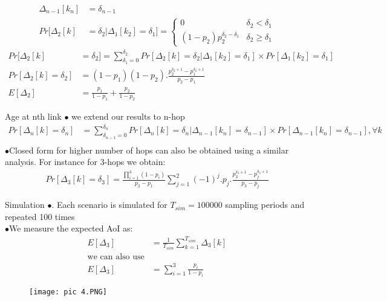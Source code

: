 \documentclass{beamer}
\begin{document}
\begin{frame}{}
 \begin{align*}
\Delta_{n-1}[k_n] &= \delta_{n-1}\\
 Pr[\Delta_2[k] &= \delta_2 | \Delta_1[k_2] = \delta_1]=
 \begin{cases}
  0&\delta_2 < \delta_1\\
  (1-p_2)p_2^{\delta_2-\delta_1} &\delta_2 \geq\delta_1
 \end{cases}
 \end{align*}
\begin{align*}
Pr[\Delta_2[k] &= \delta_2] =\sum_{\delta_1=0}^{\delta_2}
Pr[\Delta_2[k] = \delta_2 | \Delta_1[k_2] = \delta_1]
\times Pr[\Delta_1[k_2] = \delta_1]\\
Pr[\Delta_2[k] = \delta_2] &=(1-p_1)(1-p_2).\frac{p_2^{\delta_2+1}-p_1^{\delta_2+1}}{p_2-p_1}\\
E[\Delta_2]&=\frac{p_1}{1-p_1}+\frac{p_2}{1-p_2}
\end{align*}
\end{frame}

\begin{frame}{Age at nth link}
$\bullet$ we extend our results to n-hop\\
\begin{multline*}
    Pr[\Delta_n[k] = \delta_n]& =\sum_{\delta_{n-1}=0}^{\delta_n}
Pr[\Delta_n[k] = \delta_n | \Delta_{n-1}[k_n] = \delta_{n-1}]
\times Pr[\Delta_{n-1}[k_n] = \delta_{n-1}], \forall k\\
\end{multline*}
$\bullet$Closed form for higher number of hops can also be obtained
using a similar analysis. For instance for 3-hops we obtain:\\
\begin{align*}
    Pr[\Delta_3[k]=\delta_3]=\frac{\prod_{i=1}^3(1-p_i)}{p_2-p_1}\sum_{j=1}^2(-1)^j.p_j.\frac{p_3^{\delta_3+1}-p_j^{\delta_3+1}}{p_3-p_j}
\end{align*}
\end{frame}

\begin{frame}{Simulation}
   $\bullet$. Each scenario is simulated for $T_{sim} = 100 000$ sampling periods and
repeated 100 times\\
$\bullet$We measure the expected AoI as:\\
\begin{align*}
    E[\Delta_3]&=\frac{1}{T_{sim}}\sum_{k=1}^{T_{sim}}\Delta_3[k]\\
    \text{we can also use}\\
    E[\Delta_3]&=\sum_{i=1}^3\frac{p_i}{1-p_i}
\end{align*}
\end{frame}

\begin{frame}{}
  \begin{figure}[h]
    \centering
    \texttt{[image: pic 4.PNG]}
\end{figure}
\end{frame}
\end{document}
